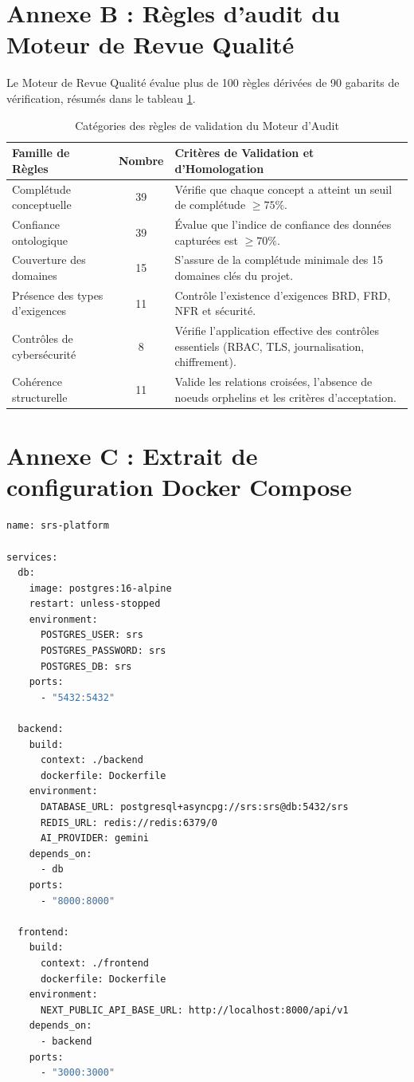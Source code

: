 \section*{Annexe B : Règles d'audit du Moteur de Revue Qualité}

Le Moteur de Revue Qualité évalue plus de 100 règles dérivées de 90 gabarits de vérification, résumés dans le tableau \ref{tab:annexe_rules}.

\begin{table}[H]
\centering
\caption{Catégories des règles de validation du Moteur d'Audit}
\label{tab:annexe_rules}
\begin{tabularx}{\textwidth}{|l|c|X|}
\hline
\rowcolor{focpgreen!18}
\textbf{Famille de Règles} & \textbf{Nombre} & \textbf{Critères de Validation et d'Homologation} \\
\hline
Complétude conceptuelle & 39 & Vérifie que chaque concept a atteint un seuil de complétude $\ge 75\%$. \\
\hline
Confiance ontologique & 39 & Évalue que l'indice de confiance des données capturées est $\ge 70\%$. \\
\hline
Couverture des domaines & 15 & S'assure de la complétude minimale des 15 domaines clés du projet. \\
\hline
Présence des types d'exigences & 11 & Contrôle l'existence d'exigences BRD, FRD, NFR et sécurité. \\
\hline
Contrôles de cybersécurité & 8 & Vérifie l'application effective des contrôles essentiels (RBAC, TLS, journalisation, chiffrement). \\
\hline
Cohérence structurelle & 11 & Valide les relations croisées, l'absence de noeuds orphelins et les critères d'acceptation. \\
\hline
\end{tabularx}
\end{table}

\section*{Annexe C : Extrait de configuration Docker Compose}

\begin{lstlisting}[language=bash, caption={Configuration Docker Compose multi-services}, label={lst:docker_compose}]
name: srs-platform

services:
  db:
    image: postgres:16-alpine
    restart: unless-stopped
    environment:
      POSTGRES_USER: srs
      POSTGRES_PASSWORD: srs
      POSTGRES_DB: srs
    ports:
      - "5432:5432"

  backend:
    build:
      context: ./backend
      dockerfile: Dockerfile
    environment:
      DATABASE_URL: postgresql+asyncpg://srs:srs@db:5432/srs
      REDIS_URL: redis://redis:6379/0
      AI_PROVIDER: gemini
    depends_on:
      - db
    ports:
      - "8000:8000"

  frontend:
    build:
      context: ./frontend
      dockerfile: Dockerfile
    environment:
      NEXT_PUBLIC_API_BASE_URL: http://localhost:8000/api/v1
    depends_on:
      - backend
    ports:
      - "3000:3000"
\end{lstlisting}

\newpage
